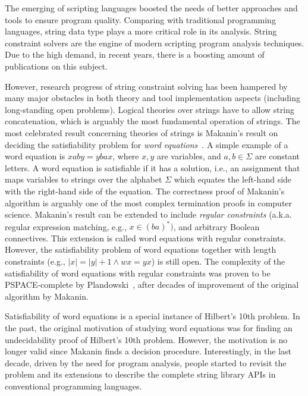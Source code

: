 
The emerging of scripting languages boosted the needs of better approaches and tools to ensure program quality.
Comparing with traditional programming languages, string data type plays a more critical role in its analysis.
String constraint solvers are the engine of modern scripting program analysis techniques. 
Due to the high demand, in recent years, there is a boosting amount of publications on this subject.

However, research progress of string constraint solving has been hampered by many major obstacles in both theory and tool implementation aspects (including long-standing open problems). 
Logical theories over strings have to allow string concatenation, which is arguably the most fundamental operation of strings. 
The most celebrated result concerning theories of strings is Makanin’s result on deciding the satisfiability problem for \emph{word equations}~\cite{makanin77}.
A simple example of a word equation is $xaby = ybax$, where $x, y$ are variables, and $a, b \in \Sigma$ are constant letters. 
A word equation is satisfiable if it has a solution, i.e., an assignment that maps variables to strings over the alphabet $\Sigma$ which equates the left-hand side with the right-hand side of the equation.
The correctness proof of Makanin’s algorithm is arguably one of the most complex termination proofs in computer science. 
Makanin’s result can be extended to include \emph{regular constraints} (a.k.a. regular expression matching, e.g., $x \in (ba)^*)$, and arbitrary Boolean connectives.
This extension is called word equations with regular constraints. 
However, the satisfiability problem of word equations together with length constraints (e.g., $|x|=|y|+1 \wedge wx=yx$) is still open.
The complexity of the satisfiability of word equations with regular constraints was proven to be PSPACE-complete by Plandowski~\cite{plandowski99}, after decades of improvement of the original algorithm by Makanin.

Satisfiability of word equations is a special instance of Hilbert’s 10th problem. 
In the past, the original motivation of studying word equations was for finding an undecidability proof of Hilbert’s 10th problem. 
However, the motivation is no longer valid since Makanin finds a decision procedure. Interestingly, in the last decade, driven by the need for program analysis, people started to revisit the problem and its extensions to describe the complete string library APIs in conventional programming languages.

